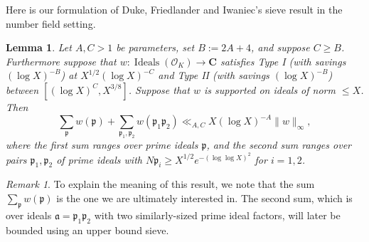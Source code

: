 \documentclass[11pt,reqno]{amsart}
\numberwithin{equation}{section}
\newtheorem{lemma}[theorem]{Lemma}
\theoremstyle{definition}
\theoremstyle{remark}
\newtheorem*{remark}{Remark}
\newcommand{\snorm}[1]{\lVert#1\rVert}
\newcommand{\mf}{\mathfrak}
\renewcommand{\le}{\leqslant}
\renewcommand{\ge}{\geqslant}
\newcommand\C{\mathbf{C}}
\newcommand\Ideals{\operatorname{Ideals}}
\renewcommand\O{\mathcal{O}}
\begin{document}
Here is our formulation of Duke, Friedlander and Iwaniec's sieve result in the number field setting.
\begin{lemma}\label{lem:sieve-input}
Let $A, C > 1$ be parameters, set $B := 2A + 4$, and suppose $C\ge B$. Furthermore suppose that $w : \Ideals(\O_K) \rightarrow \C$ satisfies Type I \textup{(}with savings $(\log X)^{-B}$\textup{)} at $X^{1/2}(\log X)^{-C}$ and Type II \textup{(}with savings $(\log X)^{-B}$\textup{)} between $[(\log X)^{C}, X^{3/8}]$. Suppose that $w$ is supported on ideals of norm $\le X$. Then
\[\sum_{\mf{p}} w(\mf{p}) + \sum_{\mf{p}_1,\mf{p}_2}  w(\mf{p}_1\mf{p}_2)\ll_{A,C} X(\log X)^{-A} \snorm{w}_{\infty} ,\] where the first sum ranges over prime ideals $\mf{p}$, and the second sum ranges over pairs $\mf{p}_1, \mf{p}_2$ of prime ideals with $N\mf{p}_i \ge X^{1/2}e^{-(\log\log X)^2}$ for $i = 1,2$.
\end{lemma}
\begin{remark}
To explain the meaning of this result, we note that the sum $\sum_{\mf{p}} w(\mf{p})$ is the one we are ultimately interested in. The second sum, which is over ideals $\mf{a} = \mf{p}_1\mf{p}_2$ with two similarly-sized prime ideal factors, will later be bounded using an upper bound sieve.
\end{remark}
\end{document}
